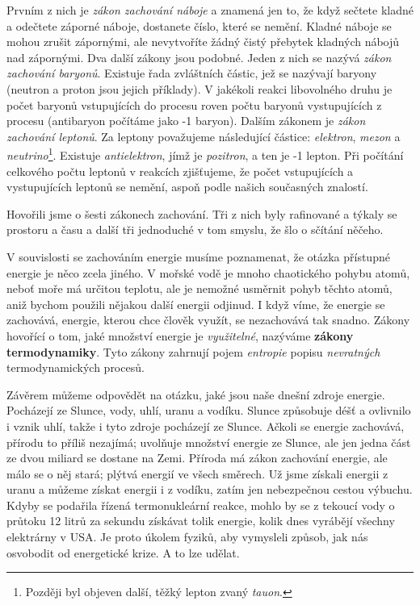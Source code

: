 {    Prvním z nich je \emph{zákon zachování náboje} a znamená jen to, že když sečtete kladné a 
    odečtete záporné náboje, dostanete číslo, které se nemění. Kladné náboje se mohou zrušit 
    zápornými, ale nevytvoříte žádný čistý přebytek kladných nábojů nad zápornými. Dva další zákony 
    jsou podobné. Jeden z nich se nazývá \emph{zákon zachování baryonů}. Existuje řada zvláštních 
    částic, jež se nazývají baryony (neutron a proton jsou jejich příklady). V jakékoli reakci 
    libovolného druhu je počet baryonů vstupujících do procesu roven počtu baryonů vystupujících z 
    procesu (antibaryon počítáme jako -1 baryon). Dalším zákonem je \emph{zákon zachování leptonů}. 
    Za leptony považujeme následující částice: \emph{elektron}, \emph{mezon} a 
    \emph{neutrino}\footnote{Později byl objeven další, těžký lepton zvaný \emph{tauon}.}. Existuje 
    \emph{antielektron}, jímž je \emph{pozitron}, a ten je -1 lepton. Při počítání celkového počtu 
    leptonů v reakcích zjišťujeme, že počet vstupujících a vystupujících leptonů se nemění, aspoň 
    podle našich současných znalostí.
    
    Hovořili jsme o šesti zákonech zachování. Tři z nich byly rafinované a týkaly se prostoru a 
    času a další tři jednoduché v tom smyslu, že šlo o sčítání něčeho.
    
    V souvislosti se zachováním energie musíme poznamenat, že otázka přístupné energie je něco 
    zcela jiného. V mořské vodě je mnoho chaotického pohybu atomů, neboť moře má určitou teplotu, 
    ale je nemožné usměrnit pohyb těchto atomů, aniž bychom použili nějakou další energii odjinud. 
    I když víme, že energie se zachovává, energie, kterou chce člověk využít, se nezachovává tak 
    snadno. Zákony hovořící o tom, jaké množství energie je \emph{využitelné}, nazýváme 
    \textbf{zákony termodynamiky}. Tyto zákony zahrnují pojem \emph{entropie} popisu 
    \emph{nevratných} termodynamických procesů.
    
    Závěrem můžeme odpovědět na otázku, jaké jsou naše dnešní zdroje energie. Pocházejí ze Slunce, 
    vody, uhlí, uranu a vodíku. Slunce způsobuje déšť a ovlivnilo i vznik uhlí, takže i tyto zdroje 
    pocházejí ze Slunce. Ačkoli se energie zachovává, přírodu to příliš nezajímá; uvolňuje množství 
    energie ze Slunce, ale jen jedna část ze dvou miliard se dostane na Zemi. Příroda má zákon 
    zachování energie, ale málo se o něj stará; plýtvá energií ve všech směrech. Už jsme získali 
    energii z uranu a můžeme získat energii i z vodíku, zatím jen nebezpečnou cestou výbuchu. Kdyby 
    se podařila řízená termonukleární reakce, mohlo by se z tekoucí vody o průtoku \num{12} litrů 
    za sekundu získávat tolik energie, kolik dnes vyrábějí všechny elektrárny v USA. Je proto 
    úkolem fyziků, aby vymysleli způsob, jak nás osvobodit od energetické krize. A to lze udělat.

}

